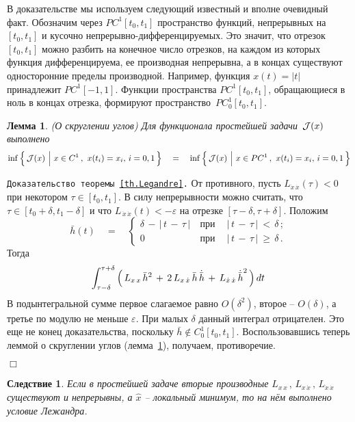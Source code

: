 \documentclass[12pt,a4paper]{article}
\newtheorem{lemma}{Лемма}
\newtheorem{cor}{Следствие}
\newcommand{\cJ}{{\cal{J}}}
\begin{document}
В доказательстве мы используем следующий известный и вполне очевидный факт.
Обозначим через $PC^1[t_0, t_1]$ пространство функций, непрерывных на $[t_0, t_1]$
и кусочно непрерывно-дифференцируемых. Это значит, что отрезок $[t_0,t_1]$
можно разбить на конечное число отрезков, на каждом из которых функция дифференцируема,
ее производная непрерывна, а в концах существуют односторонние пределы производной.
Например, функция $x(t) = |t|$ принадлежит $PC^1[-1, 1]$. Функции пространства $PC^1[t_0, t_1]$,
обращающиеся в ноль в концах отрезка, формируют пространство~$PC^1_0[t_0, t_1]$.
 \begin{lemma}\label{l.skrug}(О скруглении углов)
Для функционала простейшей задачи~$\cJ(x)$ выполнено
$$
\inf \, \Bigl\{ \, \cJ(x) \ \Bigr| \ x \in C^1\, , \ x(t_i) = x_i, \, i = 0, 1\, \Bigr\}\quad = \quad
\inf \, \Bigl\{ \, \cJ(x) \ \Bigr| \ x \in PC^1\, , \ x(t_i) = x_i, \, i = 0, 1\, \Bigr\}
$$
\end{lemma}

{\tt Доказательство теоремы~\ref{th.Legandre}.} От противного, пусть $L_{\dot x\, \dot
x}(\tau )< 0$ при некотором $\tau  \in [t_0, t_1]$. В силу
непрерывности можно считать, что $\tau \in [t_0 + \delta  , t_1 -
\delta]$ и что $ L_{\, \dot x\, \dot x}(t )< -\varepsilon$ на
отрезке $[\tau - \delta, \tau + \delta]$. Положим
$$
\bar h(t)\quad = \quad \left\{
\begin{array}{lll}
\delta \, - \, |\, t \, - \, \tau\, |\ & \mbox{при} \ & \ |\, t \, - \, \tau\, |\ < \, \delta\, ; \\
0\ & \mbox{при} \ & \ |\, t \, - \, \tau\, |\ \ge \, \delta\, .
\end{array}
\right.
$$
Тогда
$$
\int_{\tau -
\delta}^{\tau + \delta}\, \Bigl( \, L_{x\, x}\, { \bar h}^2\, + \,
2\, L_{ x\, \dot x}\, \bar h\, {\dot {\bar h}}\, + \, L_{\dot  x\,
\dot  x}\, {\dot {\bar h}}^2
  \, \Bigr)\,
d t\,
$$
В подынтегральной сумме первое слагаемое равно $O(\delta^2)$,
второе -- $O(\delta)$, а третье по модулю не меньше $\varepsilon$.
При малых $\delta$
 данный интеграл отрицателен. Это еще не конец доказательства, поскольку
$\bar h \notin C_0^1[t_0, t_1]$. Воспользовавшись теперь леммой о
скруглении углов (лемма~\ref{l.skrug}), получаем, противоречие.

{\hfill $\Box$}
\smallskip

\begin{cor}\label{c.Legandre}
Если в простейшей задаче вторые производные $L_{x\, x}\, , \,
L_{x\, \dot x}\, , \,  L_{\dot x \, \dot x}$ существуют и
непрерывны, а  $\hat x$ -- локальный минимум, то на нём
выполнено
 условие Лежандра.
\end{cor}
\end{document}
